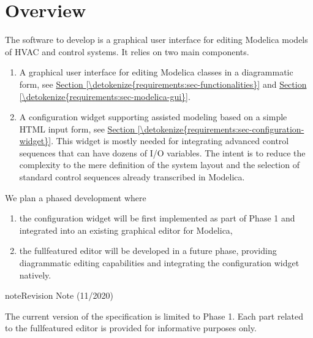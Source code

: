 \documentclass[letterpaper,10pt, openany,english]{sphinxmanual}
\begin{document}
\chapter{Overview}
\label{\detokenize{overview:overview}}\label{\detokenize{overview::doc}}
The software to develop is a graphical user interface for editing Modelica models of HVAC and control systems. It relies on two main components.
\begin{enumerate}
%
\item {} 
A graphical user interface for editing Modelica classes in a diagrammatic form, see \hyperref[\detokenize{requirements:sec-functionalities}]{Section \ref{\detokenize{requirements:sec-functionalities}}} and \hyperref[\detokenize{requirements:sec-modelica-gui}]{Section \ref{\detokenize{requirements:sec-modelica-gui}}}.

\item {} 
A configuration widget supporting assisted modeling based on a simple HTML input form, see \hyperref[\detokenize{requirements:sec-configuration-widget}]{Section \ref{\detokenize{requirements:sec-configuration-widget}}}. This widget is mostly needed for integrating advanced control sequences that can have dozens of I/O variables. The intent is to reduce the complexity to the mere definition of the system layout and the selection of standard control sequences already transcribed in Modelica.

\end{enumerate}

We plan a phased development where
\begin{enumerate}
%
\item {} 
the configuration widget will be first implemented as part of Phase 1 and integrated into an existing graphical editor for Modelica,

\item {} 
the full\sphinxhyphen{}featured editor will be developed in a future phase, providing diagrammatic editing capabilities and integrating the configuration widget natively.

\end{enumerate}

\begin{sphinxadmonition}{note}{Revision Note (11/2020)}

The current version of the specification is limited to Phase 1. Each part related to the full\sphinxhyphen{}featured editor is provided for informative purposes only.
\end{sphinxadmonition}
\end{document}
